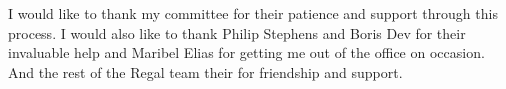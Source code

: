 \documentclass[doublespace]{sdsu-thesis}
\begin{document}
\listoffigures


\begin{acknowledgements}

I would like to thank my committee for their patience and support through this
process. I would also like to thank Philip Stephens and Boris Dev for their
invaluable help and Maribel Elias for getting me out of the office on
occasion.  And the rest of the Regal team their for friendship and support.

\end{acknowledgements}






%

%
%
%
%
\singlespacing





%
%
\begin{libraryabstract}

\end{libraryabstract}
\end{document}
